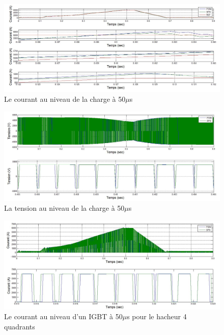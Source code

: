 \documentclass[11pt,letterpaper,final]{report}
\begin{document}
\begin{figure}[htb]
\centering
\includegraphics[scale=0.5]{Fig/Hach_AFE/50u/hach_cou_ch.jpg}
\caption{Le courant au niveau de la charge à 50$\mu$s}
\label{AF_HA_CHA50}
\end{figure}

\begin{figure}[htb]
\centering
\includegraphics[scale=0.5]{Fig/Hach_AFE/50u/hach_ten_ch.jpg}
\caption{La tension au niveau de la charge à 50$\mu$s}
\label{AF_HA_CHV50}
\end{figure}

\begin{figure}[htb]
\centering
\includegraphics[scale=0.5]{Fig/Hach_AFE/50u/IGBT_cou_hach.jpg}
\caption{Le courant au niveau d'un IGBT à 50$\mu$s pour le hacheur 4 quadrants}
\label{AF_HA_HAA50}
\end{figure}
\end{document}
